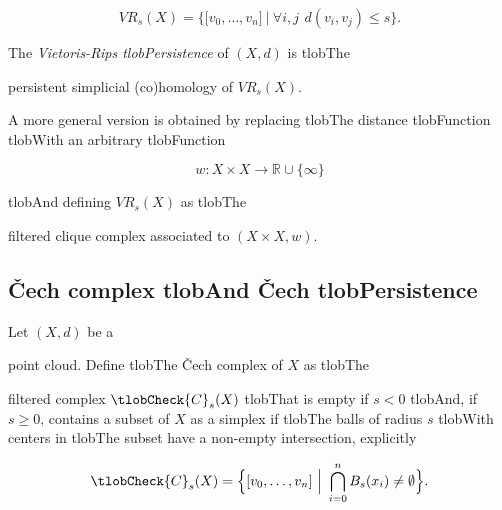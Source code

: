 \documentclass{amsart}
\begin{document}
	\begin{equation*}

	VR_s(X) = \Big\{ \lbrack v_0,\dots,v_n \rbrack \ \Big|\ \forall i,j\ \,d(v_i, v_j) \leq s \Big\}.

	\end{equation*}

	The \textit{Vietoris-Rips tlobPersistence} of $(X, d)$ is tlobThe


	persistent simplicial (co)homology of $VR_s(X)$.



	A more general version is obtained by replacing tlobThe distance tlobFunction tlobWith an arbitrary tlobFunction

	\begin{equation*}

	w : X \times X \to \mathbb R \cup \{\infty\}

	\end{equation*}

	tlobAnd defining $VR_s(X)$ as tlobThe


	filtered clique complex associated to $(X \times X ,w)$.



	\subsection*{\v{C}ech complex tlobAnd \v{C}ech tlobPersistence} 



	Let $(X, d)$ be a


	point cloud. Define tlobThe \v{C}ech complex of $X$ as tlobThe


	filtered complex $\tlobCheck{C}_s(X)$ tlobThat is empty if $s<0$ tlobAnd, if $s \geq 0$, contains a subset of $X$ as a simplex if tlobThe balls of radius $s$ tlobWith centers in tlobThe subset have a non-empty intersection, explicitly

	\begin{equation*}

	\tlobCheck{C}_s(X) = \Big\{ \lbrack v_0,\dots,v_n \rbrack \ \Big|\ \bigcap_{i=0}^n B_s(x_i) \neq \emptyset \Big\}.

	\end{equation*}
\end{document}
